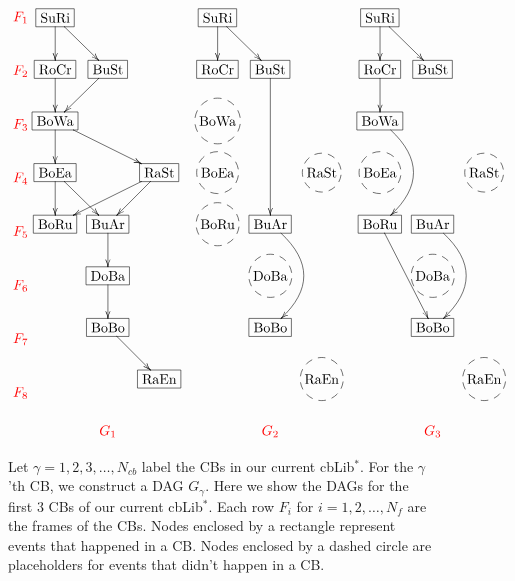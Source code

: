\documentclass[12pt]{article}
\begin{document}
\begin{figure}[h!]
$$
\xymatrix@C=.5pc{
{\color{red}F_1}
\\
{\color{red}F_2}
\\
{\color{red}F_3}
\\
{\color{red}F_4}
\\
{\color{red}F_5}
\\
{\color{red}F_6}
\\
{\color{red}F_7}
\\
{\color{red}F_8}
}
\xymatrix@C=.5pc{
*+[F]{\rm SuRi}\ar[d]\ar[dr]
\\
*+[F]{\rm RoCr}\ar[d] & *+[F]{\rm BuSt}\ar[dl]
\\
*+[F]{\rm BoWa}\ar[d]\ar[drr]
\\
*+[F]{\rm BoEa}\ar[dr]\ar[d]
&&*+[F]{\rm RaSt}\ar[dl]\ar[dll]
\\
*+[F]{\rm BoRu}
&*+[F]{\rm BuAr}\ar[d]
\\
&*+[F]{\rm DoBa}\ar[d]
\\
&*+[F]{\rm BoBo}\ar[dr]
\\
&&*+[F]{\rm RaEn}
\\
&\color{red}G_1
}
\quad %
\xymatrix@C=.5pc{
*+[F]{\rm SuRi}\ar[d]\ar[dr]
\\
*+[F]{\rm RoCr} 
& *+[F]{\rm BuSt}\ar[ddd]
\\
*+[F-o]{\rm BoWa}
\\
*+[F-o]{\rm BoEa}
&&*+[F-o]{\rm RaSt}
\\
*+[F-o]{\rm BoRu}
&*+[F]{\rm BuAr}\ar@/^2pc/[dd]
\\
&*+[F-o]{\rm DoBa}
\\
&*+[F]{\rm BoBo}
\\
&&*+[F-o]{\rm RaEn}
\\
&\color{red}G_2
}
\quad %
\xymatrix@C=.5pc{
*+[F]{\rm SuRi}\ar[d]\ar[dr]
\\
*+[F]{\rm RoCr}\ar[d] 
& *+[F]{\rm BuSt}
\\
*+[F]{\rm BoWa}\ar@/^2pc/[dd]
\\
*+[F-o]{\rm BoEa}
&&*+[F-o]{\rm RaSt}
\\
*+[F]{\rm BoRu}\ar[ddr]
&*+[F]{\rm BuAr}\ar@/^2pc/[dd]
\\
&*+[F-o]{\rm DoBa}
\\
&*+[F]{\rm BoBo}
\\
&&*+[F-o]{\rm RaEn}
\\
&\color{red}G_3
}
$$
\caption{
Let 
$\gamma=1,2, 3, \ldots, N_{cb}$
label the CBs in
our current cbLib$^*$.
For the $\gamma$'th 
CB, we construct
a DAG  $G_\gamma$.
  Here we show  the 
  DAGs for the first
  3 CBs
  of our current cbLib$^*$.
 Each row $F_i$ for 
 $i=1,2, \dots, N_f$
 are the frames of the CBs.
 Nodes enclosed by 
 a rectangle
 represent events that
 happened
 in a CB.
Nodes enclosed by a dashed circle
are
placeholders for
events that didn't happen
in a CB.}
\label{fig-dags123}
\end{figure}
\end{document}
